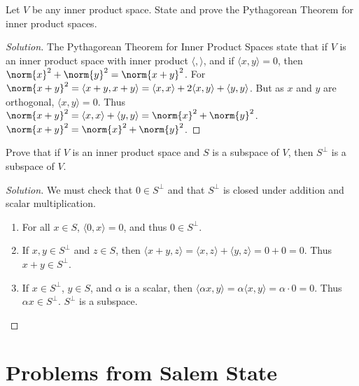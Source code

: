 \documentclass[crop=false,class=book,oneside]{standalone}
\begin{document}
        \begin{problem}
        Let $V$ be any inner product space. State and prove the Pythagorean Theorem for inner product spaces.
        \end{problem}
        \begin{proof}[Solution]
        The Pythagorean Theorem for Inner Product Spaces state that if $V$ is an inner product space with inner product $\langle, \rangle$, and if $\langle x,y\rangle = 0$, then $\norm{x}^2+\norm{y}^2 = \norm{x+y}^2$. For $\norm{x+y}^2 = \langle x+y,x+y\rangle = \langle x,x\rangle + 2\langle x,y\rangle +\langle y,y\rangle$. But as $x$ and $y$ are orthogonal, $\langle x,y \rangle = 0$. Thus $\norm{x+y}^2 = \langle x,x\rangle + \langle y,y\rangle = \norm{x}^2+\norm{y}^2$. $\norm{x+y}^2 =\norm{x}^2+\norm{y}^2$.
        \end{proof}
        \begin{problem}
        Prove that if $V$ is an inner product space and $S$ is a subspace of $V$, then $S^{\perp}$ is a subspace of $V$.
        \end{problem}
        \begin{proof}[Solution]
        We must check that $0\in S^{\perp}$ and that $S^{\perp}$ is closed under addition and scalar multiplication.
        \begin{enumerate}
            \item For all $x\in S$, $\langle 0,x \rangle = 0$, and thus $0\in S^{\perp}$.
            \item If $x,y\in S^{\perp}$ and $z\in S$, then $\langle x+y,z\rangle = \langle x,z\rangle + \langle y,z\rangle = 0+0=0$. Thus $x+y\in S^{\perp}$.
            \item If $x\in S^{\perp}$, $y\in S$, and $\alpha$ is a scalar, then $\langle \alpha x,y \rangle = \alpha \langle x,y \rangle = \alpha \cdot 0 = 0$. Thus $\alpha x \in S^{\perp}$. $S^{\perp}$ is a subspace.
        \end{enumerate}
        \end{proof}
    \section{Problems from Salem State}
\end{document}
